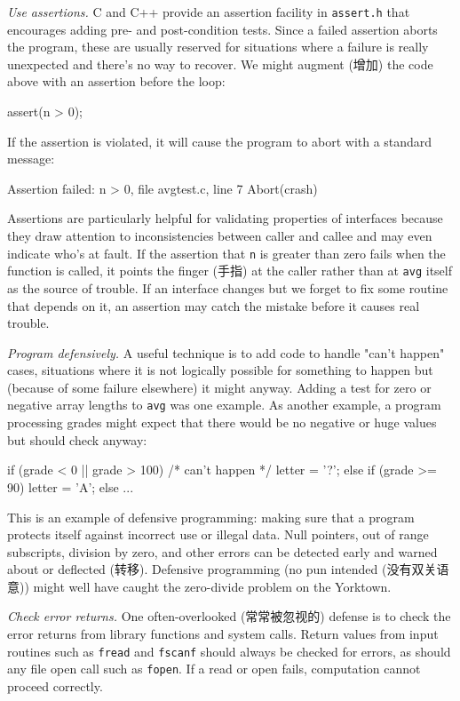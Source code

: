 \emph{Use assertions.} C and C++ provide an assertion facility in
\verb'assert.h' that encourages adding pre- and post-condition tests. Since
a failed assertion aborts the program, these are usually reserved for
situations where a failure is really unexpected and there's no way to
recover. We might augment (增加) the code above with an assertion before
the loop:
\begin{wellcode}
    assert(n > 0);
\end{wellcode}
If the assertion is violated, it will cause the program to abort with a
standard message:
\begin{wellcode}
    Assertion failed: n > 0, file avgtest.c, line 7
    Abort(crash)
\end{wellcode}
Assertions are particularly helpful for validating properties of interfaces
because they draw attention to inconsistencies between caller and callee
and may even indicate who's at fault. If the assertion that \verb'n' is
greater than zero fails when the function is called, it points the finger
(手指) at the caller rather than at \verb'avg' itself as the source of
trouble.  If an interface changes but we forget to fix some routine that
depends on it, an assertion may catch the mistake before it causes real
trouble.

\emph{Program defensively.} A useful technique is to add code to handle
"can't happen" cases, situations where it is not logically possible for
something to happen but (because of some failure elsewhere) it might
anyway. Adding a test for zero or negative array lengths to \verb'avg' was
one example. As another example, a program processing grades might expect
that there would be no negative or huge values but should check anyway:
\begin{wellcode}
    if (grade < 0 || grade > 100) /* can't happen */
        letter = '?';
    else if (grade >= 90)
        letter = 'A';
    else
        ...
\end{wellcode}
This is an example of defensive programming: making sure that a program
protects itself against incorrect use or illegal data. Null pointers, out
of range subscripts, division by zero, and other errors can be detected
early and warned about or deflected (转移).  Defensive programming (no pun
intended (没有双关语意)) might well have caught the zero-divide problem on
the Yorktown.

\emph{Check error returns.} One often-overlooked (常常被忽视的) defense is
to check the error returns from library functions and system calls. Return
values from input routines such as \verb'fread' and \verb'fscanf' should
always be checked for errors, as should any file open call such as
\verb'fopen'. If a read or open fails, computation cannot proceed
correctly.

